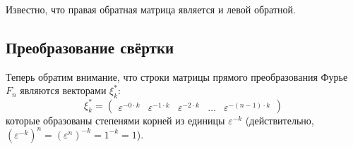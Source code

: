 Известно, что правая обратная матрица является и левой обратной.

\subsection{Преобразование свёртки}

Теперь обратим внимание, что строки матрицы прямого преобразования Фурье $F_n$ являются векторами $\xi_k^*$:
\[
    \xi_k^*
    = \begin{pmatrix}
          \varepsilon^{- 0 \cdot k} & \varepsilon^{- 1 \cdot k} & \varepsilon^{- 2 \cdot k} & \dots & \varepsilon^{- (n-1) \cdot k}
    \end{pmatrix}
\]
которые образованы степенями корней из единицы $\varepsilon^{-k}$ (действительно, $\left ( \varepsilon^{-k} \right )^n = \left ( \varepsilon^n \right )^{-k} = 1^{-k} = 1$).

